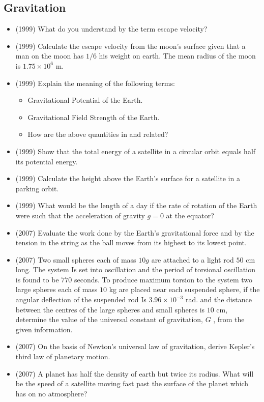 \documentclass{article}
\begin{document}
\subsection{Gravitation}
\begin{itemize}
\item (1999)  What do you understand by the term escape velocity?
\item (1999)  Calculate the escape velocity from the moon’s surface given that a man on the moon has $ 1/6$ his weight on earth. The mean radius of the moon is $ 1.75 \times 10^6$ m.
\item (1999)  Explain the meaning of the following terms:\begin{itemize}
\item Gravitational Potential of the Earth.
\item Gravitational Field Strength of the Earth.
\item How are the above quantities in and related?
\end{itemize}
\item (1999)  Show that the total energy of a satellite in a circular orbit equals half its potential energy.
\item (1999)  Calculate the height above the Earth's surface for a satellite in a parking orbit.
\item (1999)  What would be the length of a day if the rate of rotation of the Earth were such that the acceleration of gravity $ g=0$ at the equator?
\item (2007)  Evaluate the work done by the Earth's gravitational force and by the tension in the string as the ball moves from its highest to its lowest point.
\item (2007)  Two small spheres each of mass $ 10g$ are attached to a light rod $ 50$ cm long. The system Is set into oscillation and the period of torsional oscillation is found to be $ 770$ seconds. To produce maximum torsion to the system two large spheres each of mass $ 10$ kg are placed near each suspended sphere, if the angular deflection of the suspended rod Is $ 3.96 \times 10^{-3}$ rad. and the distance between the centres of the large spheres and small spheres is $ 10$ cm, determine the value of the universal constant of gravitation, $ G$ , from the given information. 
\item (2007)  On the basis of Newton’s universal law of gravitation, derive Kepler’s third law of planetary motion. 
\item (2007)  A planet has half the density of earth but twice its radius. What will be the speed of a satellite moving fast past the surface of the planet which has on no atmosphere?\begin{itemize}

\end{itemize}
\end{itemize}
\end{document}
